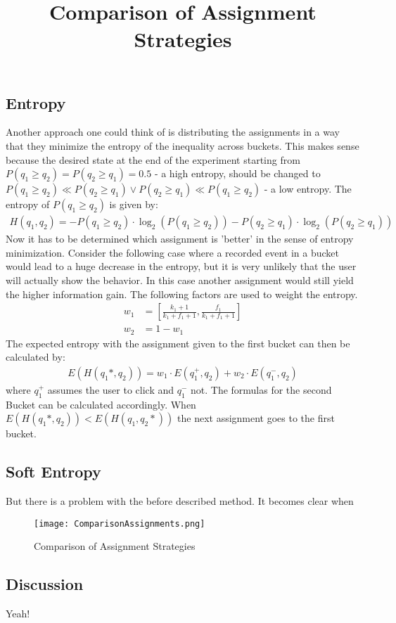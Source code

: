 \documentclass[../Thesis.tex]{subfiles}
\begin{document}
\subsection{Entropy}
Another approach one could think of is distributing the assignments in a way that they minimize the entropy of the inequality across buckets. This makes sense because the desired state at the end of the experiment starting from $P(q_1\geq q_2)=P(q_2\geq q_1)=0.5$ - a high entropy, should be changed to $P(q_1\geq q_2)\ll P(q_2\geq q_1) \lor P(q_2\geq q_1)\ll P(q_1\geq q_2)$ - a low entropy. The entropy of $P(q_1\geq q_2)$ is given by:
\begin{align*}
H(q_1,q_2) 	= - P(q_1\geq q_2) \cdot \log_2(P(q_1\geq q_2)) - P(q_2\geq q_1) \cdot \log_2(P(q_2\geq q_1))
\end{align*}
Now it has to be determined which assignment is 'better' in the sense of entropy minimization. Consider the following case where a recorded event in a bucket would lead to a huge decrease in the entropy, but it is very unlikely that the user will actually show the behavior. In this case another assignment would still yield the higher information gain. The following factors are used to weight the entropy.
\begin{align*}
w_1 &=[\frac{k_1+1}{k_1+f_1+1},\frac{f_1}{k_1+f_1+1}] \\
w_2 &=1 - w_1
\end{align*}
The expected entropy with the assignment given to the first bucket can then be calculated by:
\begin{align*}
E(H(q_1*,q_2)) = w_1\cdot E(q_1^+,q_2) + w_2\cdot E(q_1^-,q_2)
\end{align*}
where $q_1^+$ assumes the user to click and $q_1^-$ not. The formulas for the second Bucket can be calculated accordingly. When $E(H(q_1*,q_2)) < E(H(q_1,q_2*))$ the next assignment goes to the first bucket.
\subsection{Soft Entropy}
But there is a problem with the before described method. It becomes clear when 
\begin{figure}[ht]
\texttt{[image: ComparisonAssignments.png]}
\centering
\title{Comparison of Assignment Strategies}
\caption{Comparison of Assignment Strategies}
\end{figure}
\subsection{Discussion}
Yeah!
\end{document}
